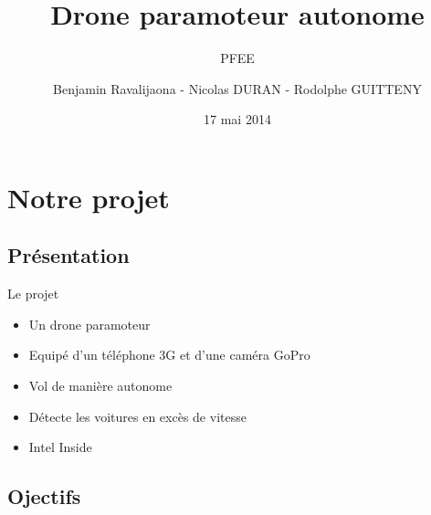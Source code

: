 \documentclass[transparent]{beamer}
\title{Drone paramoteur autonome}
\subtitle{PFEE}
\author{Benjamin  Ravalijaona - Nicolas DURAN - Rodolphe GUITTENY}
\institute{SCIA 2015 \\ EPITA}
\date{17 mai 2014}
\begin{document}
\begin{frame}
	\titlepage
\end{frame}

\begin{frame}
\begin{multicols}{2}
	\tableofcontents
\end{multicols}
\end{frame}

\section{Notre projet}
\subsection{Présentation}

\begin{frame}

	\begin{block}{Le projet}
			\begin{itemize}
				\item Un drone paramoteur
				\item Equipé d'un téléphone 3G et d'une caméra GoPro
				\item Vol de manière autonome
				\item Détecte les voitures en excès de vitesse
				\item Intel Inside
			\end{itemize}
	\end{block}
\end{frame}

\subsection{Ojectifs}
\end{document}
